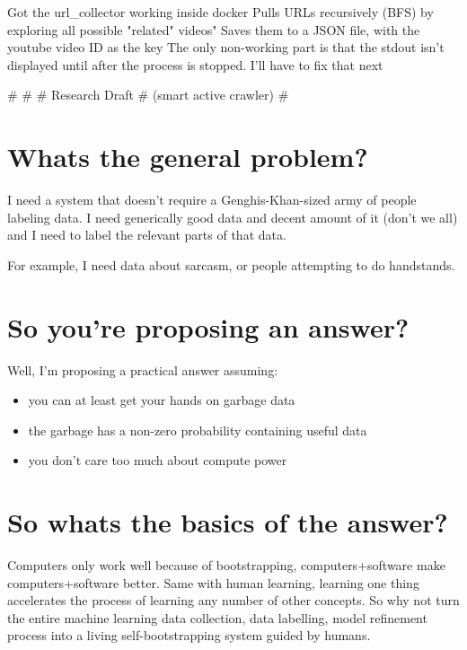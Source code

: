\documentclass{article}
\newcommand{\br}{ \hfill \break}
\begin{document}
%
%
%
\date{January 21 2020} \br \begin{adjustwidth}{2.5em}{0pt}

Got the url{\_}collector working inside docker
Pulls URLs recursively (BFS) by exploring all possible "related" videos" 
Saves them to a JSON file, with the youtube video ID as the key
The only non-working part is that the stdout isn't displayed until after the process is stopped. I'll have to fix that next

\end{adjustwidth} \br 




%
%
%
\# \br
\# \br 
\# Research Draft \br
\# (smart active crawler) \br 
\# \br
\date{January 2020} \br
\begin{adjustwidth}{2.5em}{0pt}


\section{Whats the general problem?}

I need a system that doesn't require a Genghis-Khan-sized army of people labeling data. I need generically good data and decent amount of it (don't we all) and I need to label the relevant parts of that data.

For example, I need data about sarcasm, or people attempting to do handstands. 

\section{So you're proposing an answer?}

Well, I'm proposing a practical answer assuming:
\begin{itemize}
    \item you can at least get your hands on garbage data
    \item the garbage has a non-zero probability containing useful data
    \item you don't care too much about compute power
\end{itemize}

\section{So whats the basics of the answer?}

Computers only work well because of bootstrapping, computers+software make computers+software better.
Same with human learning, learning one thing accelerates the process of learning any number of other concepts.
So why not turn the entire machine learning data collection, data labelling, model refinement process into a living self-bootstrapping system guided by humans.


\end{adjustwidth}
\end{document}
